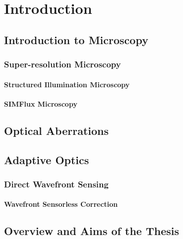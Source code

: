 \chapter{Introduction}

\section{Introduction to Microscopy}
\label{sec:microscopy_intro}

\subsection{Super-resolution Microscopy}
\label{subsec:super_res}

\subsubsection{Structured Illumination Microscopy}
\label{subsubsec:SIM}

\subsubsection{SIMFlux Microscopy}
\label{subsubsec:SIMFlux}

\section{Optical Aberrations}
\label{sec:optical_aberrations}

\section{Adaptive Optics}
\label{sec:AO}

\subsection{Direct Wavefront Sensing}
\label{subsec:direct_wavefront_sensing}

\subsubsection{Wavefront Sensorless Correction}
\label{subsec:sensorlessAO}

\section{Overview and Aims of the Thesis}
\label{sec:thesis_overview}
